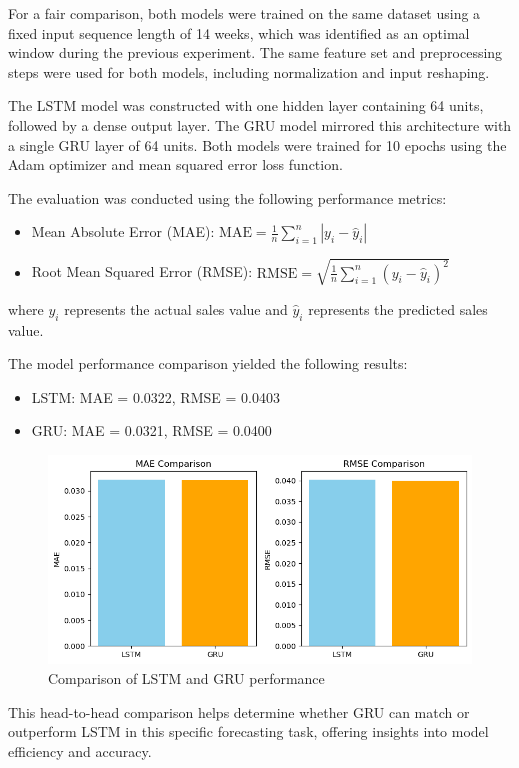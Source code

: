 \documentclass[conference]{IEEEtran}
\begin{document}
For a fair comparison, both models were trained on the same dataset using a fixed input sequence length of 14 weeks, which was identified as an optimal window during the previous experiment. The same feature set and preprocessing steps were used for both models, including normalization and input reshaping.

The LSTM model was constructed with one hidden layer containing 64 units, followed by a dense output layer. The GRU model mirrored this architecture with a single GRU layer of 64 units. Both models were trained for 10 epochs using the Adam optimizer and mean squared error loss function.

The evaluation was conducted using the following performance metrics:
\begin{itemize}
  \item Mean Absolute Error (MAE): $\text{MAE} = \frac{1}{n}\sum_{i=1}^{n}|y_i - \hat{y}_i|$
  \item Root Mean Squared Error (RMSE): $\text{RMSE} = \sqrt{\frac{1}{n}\sum_{i=1}^{n}(y_i - \hat{y}_i)^2}$
\end{itemize}
where $y_i$ represents the actual sales value and $\hat{y}_i$ represents the predicted sales value.

The model performance comparison yielded the following results:
\begin{itemize}
  \item LSTM: MAE = 0.0322, RMSE = 0.0403
  \item GRU: MAE = 0.0321, RMSE = 0.0400
\end{itemize}

\begin{figure}[H]
\centering
\includegraphics[width=0.95\linewidth]{lstm_vs_gru_results.png}
\caption{Comparison of LSTM and GRU performance}
\label{fig:lstm_vs_gru}
\end{figure}

This head-to-head comparison helps determine whether GRU can match or outperform LSTM in this specific forecasting task, offering insights into model efficiency and accuracy.
\end{document}
